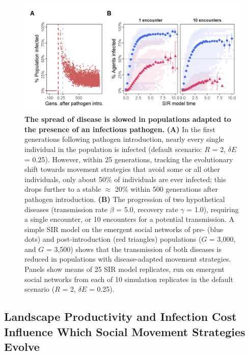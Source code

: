 \begin{figure}[!h]
    \centering
    \includegraphics[width=0.9\linewidth]{figures/pathomove/fig_04.png}
    \caption{
        \textbf{The spread of disease is slowed in populations adapted to the presence of an infectious pathogen.}
        \textbf{(A)} In the first generations following pathogen introduction, nearly every single individual in the population is infected (default scenario: $R$ = 2, $\delta E$ = 0.25).
        However, within 25 generations, tracking the evolutionary shift towards movement strategies that avoid some or all other individuals, only about 50\% of individuals are ever infected; this drops further to a stable $\approx$ 20\% within 500 generations after pathogen introduction.
        \textbf{(B)} The progression of two hypothetical diseases (transmission rate $\beta$ = 5.0, recovery rate $\gamma$ = 1.0), requiring  a single encounter, or 10 encounters for a potential transmission.
        A simple SIR model on the emergent social networks of pre- (blue dots) and post-introduction (red triangles) populations ($G$ = 3,000, and $G$ = 3,500) shows that the transmission of both diseases is reduced in populations with disease-adapted movement strategies.
        Panels show means of 25 SIR model replicates, run on emergent social networks from each of 10 simulation replicates in the default scenario ($R$ = 2, $\delta E$ = 0.25).
    }\label{patho_fig_04}
\end{figure}

\subsection*{Landscape Productivity and Infection Cost Influence Which Social Movement Strategies Evolve}


